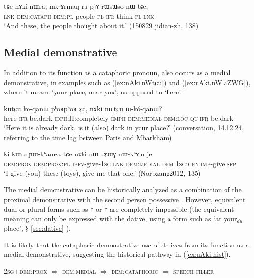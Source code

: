 \begin{exe}
\ex \label{ex:nAki.nWra}
\gll  tɕe nɤki nɯra, mkʰɤrmaŋ ra pjɤ-rɯsɯso-nɯ tɕe, \\
\textsc{lnk} \textsc{dem:cataph} \textsc{dem}:\textsc{pl} people \textsc{pl} \textsc{ifr}-think-\textsc{pl} \textsc{lnk} \\
\glt `And these, the people thought about it.' (150829 jidian-zh, 138)
\end{exe}

\subsection{Medial demonstrative}
In addition to its function as a cataphoric pronoun,  also occurs as a medial demonstrative, in examples such as (\ref{ex:nAki.nWtɕu}) and (\ref{ex:nAki.nW.aZWG}), where it means `your place, near you', as opposed to `here'.

\begin{exe}
\ex \label{ex:nAki.nWtɕu}
\gll kutɕu ko-qanɯ pʰoʁpʰoʁ ʑo, nɤki nɯtɕu ɯ-kó-qanɯ? \\
here \textsc{ifr}-be.dark \textsc{idph}:II:completely \textsc{emph} \textsc{dem}:\textsc{medial} \textsc{dem}:\textsc{loc} \textsc{qu}-\textsc{ifr}-be.dark \\
\glt `Here it is already dark, is it (also) dark in your place?' (conversation, 14.12.24, referring to the time lag between Paris and Mbarkham)
\end{exe}

\begin{exe}
\ex \label{ex:nAki.nW.aZWG}
\gll  ki kɯra ɲɯ-kʰam-a tɕe nɤki nɯ aʑɯɣ nɯ-kʰɤm je \\
\textsc{dem}:\textsc{prox} \textsc{dem}:\textsc{prox}:\textsc{pl}  \textsc{ipfv}-give-\textsc{1sg} \textsc{lnk} \textsc{dem}:\textsc{medial} \textsc{dem} \textsc{1sg}:\textsc{gen} \textsc{imp}-give \textsc{sfp} \\
\glt `I give (you) these (toys), give me that one.'  (Norbzang2012, 135)
\end{exe}

The medial demonstrative  can be historically analyzed as a combination of the proximal demonstrative  with the second person possessive . However, equivalent dual or plural forms such as  $\dagger$ or $\dagger$ are completely impossible (the equivalent meaning can only be expressed with the dative, using a form such as  `at your$_{du}$ place', § \ref{sec:dative} ).


It is likely that the cataphoric demonstrative use of  derives  from its function as a medial demonstrative, suggesting the historical pathway in (\ref{ex:nAki.hist}).

\begin{exe}
\ex \label{ex:nAki.hist}
\glt \textsc{2sg}+\textsc{dem}:\textsc{prox} $\Rightarrow$ \textsc{dem}:\textsc{medial} $\Rightarrow$ \textsc{dem}:\textsc{cataphoric} $\Rightarrow$ \textsc{speech filler}
\end{exe}


